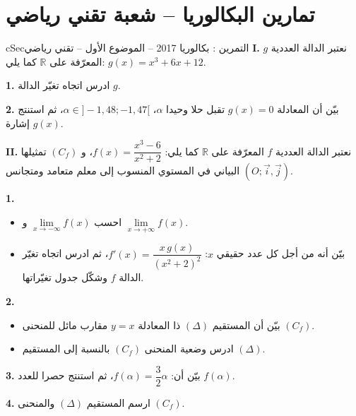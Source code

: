 \documentclass[12pt,a4paper]{article}
\newenvironment{BOX}[2]{\begin{otherlanguage}{english}\begin{arbox}{#1}{#2}}{\end{arbox}\end{otherlanguage}}
\newcounter{exo}
\newenvironment{tamrin}[1]{\stepcounter{exo}\begin{BOX}{cSec}{التمرين \theexo: #1}}{\end{BOX}}
\newcommand{\R}{\mathbb{R}}
\newenvironment{sq}{\begin{itemize}[leftmargin=2.4em,itemsep=3pt]}{\end{itemize}}
\newcommand{\qa}{\item[(أ)]}\newcommand{\qb}{\item[(ب)]}\newcommand{\qc}{\item[(جـ)]}\newcommand{\qd}{\item[(د)]}\newcommand{\qe}{\item[(هـ)]}
\newcommand{\QQ}[1]{\par\smallskip\textbf{#1.} }
\begin{document}
\section{تمارين البكالوريا -- شعبة تقني رياضي}
\begin{tamrin}{بكالوريا 2017 -- الموضوع الأول -- تقني رياضي}
\textbf{I.} نعتبر الدالة العددية $g$ المعرّفة على $\R$ كما يلي: $g(x)=x^{3}+6x+12$.
\QQ{1} ادرس اتجاه تغيّر الدالة $g$.
\QQ{2} بيّن أن المعادلة $g(x)=0$ تقبل حلا وحيدا $\alpha$، $\alpha\in]-1{,}48;-1{,}47[$، ثم استنتج إشارة $g(x)$.

\textbf{II.} نعتبر الدالة العددية $f$ المعرّفة على $\R$ كما يلي: $f(x)=\dfrac{x^{3}-6}{x^{2}+2}$، و $(C_f)$ تمثيلها البياني في المستوي المنسوب إلى معلم متعامد ومتجانس $(O;\vec i,\vec j)$.
\QQ{1}
\begin{sq}
\qa احسب $\lim\limits_{x\to-\infty}f(x)$ و $\lim\limits_{x\to+\infty}f(x)$.
\qb بيّن أنه من أجل كل عدد حقيقي $x$: $f'(x)=\dfrac{x\,g(x)}{(x^{2}+2)^{2}}$، ثم ادرس اتجاه تغيّر الدالة $f$ وشكّل جدول تغيّراتها.
\end{sq}
\QQ{2}
\begin{sq}
\qa بيّن أن المستقيم $(\Delta)$ ذا المعادلة $y=x$ مقارب مائل للمنحنى $(C_f)$.
\qb ادرس وضعية المنحنى $(C_f)$ بالنسبة إلى المستقيم $(\Delta)$.
\end{sq}
\QQ{3} بيّن أن: $f(\alpha)=\dfrac32\alpha$، ثم استنتج حصرا للعدد $f(\alpha)$.
\QQ{4} ارسم المستقيم $(\Delta)$ والمنحنى $(C_f)$.
\end{tamrin}
\end{document}
